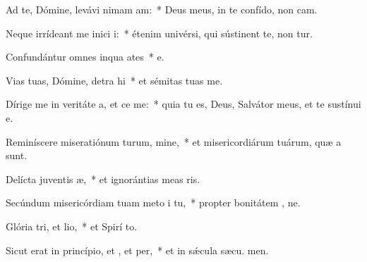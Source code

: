 \item Ad te, Dómine, levávi nimam am:~* Deus meus, in te confído, non cam.
\item Neque irrídeant me inici i:~* étenim univérsi, qui sústinent te, non tur.
\item Confundántur omnes inqua ates~* e.
\item Vias tuas, Dómine, detra hi~* et sémitas tuas  me.
\item Dírige me in veritáte a, et ce me:~* quia tu es, Deus, Salvátor meus, et te sustínui  e.
\item Reminíscere miseratiónum turum, mine,~* et misericordiárum tuárum, quæ a  sunt.
\item Delícta juventis æ,~* et ignorántias meas  ris.
\item Secúndum misericórdiam tuam meto i tu,~* propter bonitátem , ne.
\item Glória tri, et lio,~* et Spirí to.
\item Sicut erat in princípio, et , et per,~* et in sǽcula sæcu. men.
